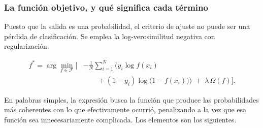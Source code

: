 \subsubsection{La función objetivo, y qué significa cada término}

Puesto que la salida es una probabilidad, el criterio de ajuste no puede ser
una pérdida de clasificación. Se emplea la log-verosimilitud negativa con
regularización:

\begin{equation}
\label{eq:ajuste}
\begin{split}
f^{*} = \arg\min_{f \in \mathcal{F}} \Big[
  &-\frac{1}{N}\sum_{i=1}^{N}
   \Big( y_i \log f(x_i) \\[-2pt]
  &\qquad + (1-y_i)\log\big(1-f(x_i)\big) \Big)
  \;+\; \lambda\,\Omega(f) \Big].
\end{split}
\end{equation}

En palabras simples, la expresión busca la función que produce las
probabilidades más coherentes con lo que efectivamente ocurrió, penalizando
a la vez que esa función sea innecesariamente complicada. Los elementos son
los siguientes.

